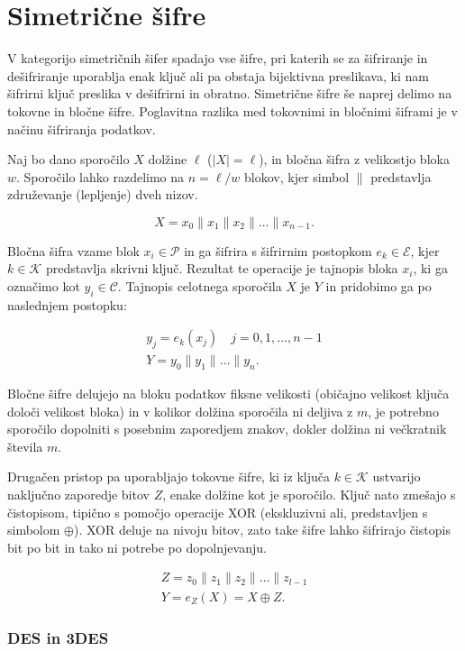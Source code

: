 \documentclass[12pt,a4paper,openany,tikz]{book}
\theoremstyle{plain}
\theoremstyle{definition}
\begin{document}
\section{Simetrične šifre}

V kategorijo simetričnih šifer spadajo vse šifre, pri katerih se za šifriranje in dešifriranje uporablja enak ključ ali pa obstaja bijektivna preslikava, ki nam šifrirni ključ preslika v dešifrirni in obratno. Simetrične šifre še naprej delimo na tokovne in bločne šifre. Poglavitna razlika med tokovnimi in bločnimi šiframi je v načinu šifriranja podatkov.

Naj bo dano sporočilo $X$ dolžine $\ell$ ($|X|=\ell$), in bločna šifra z velikostjo bloka $w$. Sporočilo lahko razdelimo na $n=\ell/w$ blokov, kjer simbol $\|$ predstavlja združevanje (lepljenje) dveh nizov.

$$
X=x_0 \| x_1 \| x_2 \| \dotsc \| x_{n-1}.
$$

Bločna šifra vzame blok $x_i \in \mathcal{P}$ in ga šifrira s šifrirnim postopkom $e_k \in \mathcal{E}$, kjer $k \in \mathcal{K}$ predstavlja skrivni ključ. Rezultat te operacije je tajnopis bloka $x_i$, ki ga označimo kot $y_i \in \mathcal{C}$. Tajnopis celotnega sporočila $X$ je $Y$ in pridobimo ga po naslednjem postopku:

\begin{gather*}
  y_j = e_k(x_j) \quad j=0,1,\dotsc,n-1\\
  Y = y_0 \| y_1 \| \dotsc \| y_n.
\end{gather*}

Bločne šifre delujejo na bloku podatkov fiksne velikosti (običajno velikost ključa določi velikost bloka) in v kolikor dolžina sporočila ni deljiva z $m$, je potrebno sporočilo dopolniti s posebnim zaporedjem znakov, dokler dolžina ni večkratnik števila $m$.

Drugačen pristop pa uporabljajo tokovne šifre, ki iz ključa $k \in \mathcal{K}$ ustvarijo naključno zaporedje bitov $Z$, enake dolžine kot je sporočilo. Ključ nato zmešajo s čistopisom, tipično s pomočjo operacije \rm{XOR} (ekskluzivni ali, predstavljen s simbolom $\oplus$). \rm{XOR} deluje na nivoju bitov, zato take šifre lahko šifrirajo čistopis bit po bit in tako ni potrebe po dopolnjevanju.

\begin{gather*}
Z=z_0 \| z_1 \| z_2 \| \dotsc \| z_{l-1} \\
Y=e_Z(X)= X \oplus Z.
\end{gather*}

\subsubsection{DES in 3DES}
\label{subs:DES in 3DES}
\end{document}
